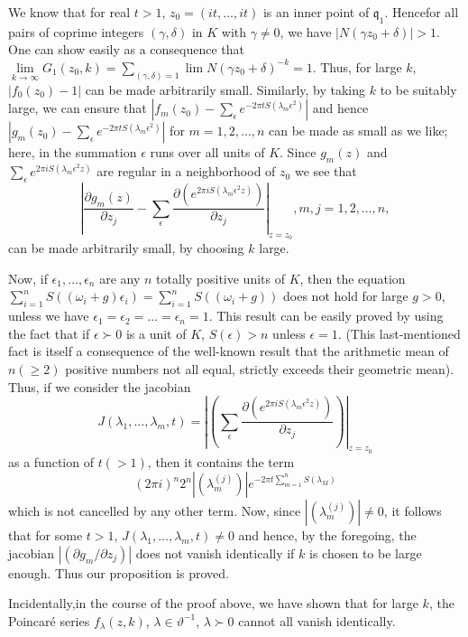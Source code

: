 We know that for real $t>1$, $z_{0}=(it,\ldots,it)$ is an inner point
of $\mathfrak{q}_{1}$. Hence\pageoriginale for all pairs of coprime
integers $(\gamma,\delta)$ in $K$ with $\gamma\neq 0$, we have
$|N(\gamma z_{0}+\delta)|>1$. One can show easily as a consequence
that $\lim\limits_{k\to
  \infty}G_{1}(z_{0},k)=\sum\limits_{(\gamma,\delta)=1}\lim N(\gamma
z_{0}+\delta)^{-k}=1$. Thus, for large $k$, $|f_{0}(z_{0})-1|$ can be
made arbitrarily small. Similarly, by taking $k$ to be suitably large,
we can ensure that $|f_{m}(z_{0})-\sum\limits_{\epsilon}e^{-2\pi
  tS(\lambda_{m}\epsilon^{2})}|$ and hence
$|g_{m}(z_{0})-\sum\limits_{\epsilon}e^{-2\pi
  tS(\lambda_{m}\epsilon^{2})}|$ for $m=1,2,\ldots,n$ can be made as
small as we like; here, in the summation $\epsilon$ runs over all
units of $K$. Since $g_{m}(z)$ and $\sum\limits_{\epsilon}e^{2\pi
  iS(\lambda_{m}\epsilon^{2}z)}$ are regular in a neighborhood of
$z_{0}$ we see that
$$
\left|\frac{\partial g_{m}(z)}{\partial
  z_{j}}-\sum_{\epsilon}\frac{\partial\left(e^{2\pi
    iS(\lambda_{m}\epsilon^{2}z)}\right)}{\partial
  z_{j}}\right|_{z=z_{0}}, m,j=1,2,\ldots,n,
$$
can be made arbitrarily small, by choosing $k$ large.

Now, if $\epsilon_{1},\ldots,\epsilon_{n}$ are any $n$ totally
positive units of $K$, then the equation
$\sum\limits^{n}_{i=1}S((\omega_{i}+g)\epsilon_{i})=\sum\limits^{n}_{i=1}S((\omega_{i}+g))$
does not hold for large $g>0$, unless we have
$\epsilon_{1}=\epsilon_{2}=\ldots=\epsilon_{n}=1$. This result can be
easily proved by using the fact that if $\epsilon \succ 0$ is a unit of $K$,
$S(\epsilon)>n$ unless $\epsilon=1$. (This last-mentioned fact is
itself a consequence of the well-known result that the arithmetic mean
of $n(\geq 2)$ positive numbers not all equal, strictly exceeds their
geometric mean). Thus, if we consider the jacobian
$$
J(\lambda_{1},\ldots,\lambda_{m},t)=\left|\left(\sum_{\epsilon}\frac{\partial\left(e^{2\pi
    iS(\lambda_{m}\epsilon^{2}z)}\right)}{\partial
  z_{j}}\right)\right|_{z=z_{0}} 
$$
as a function of $t(>1)$, then it contains the term 
$$(2\pi
i)^{n}2^{n}|(\lambda^{(j)}_{m})|e^{-2\pi
  t\sum\limits^{n}_{m=1}S(\lambda_{M})}$$ 
which is not cancelled by any
other term. Now, since $|(\lambda^{(j)}_{m})|\neq 0$, it follows that
for some $t>1$, $J(\lambda_{1},\ldots,\lambda_{m},t)\neq 0$ and hence,
by the foregoing, the jacobian $|(\partial g_{m}/\partial z_{j})|$
does not vanish identically if $k$ is chosen to be large enough. Thus
our proposition is proved.

Incidentally,\pageoriginale in the course of the proof above, we have
shown that for large $k$, the Poincar\'e series $f_{\lambda}(z,k)$,
$\lambda\in\vartheta^{-1}$, $\lambda \succ 0$ cannot all vanish identically.

